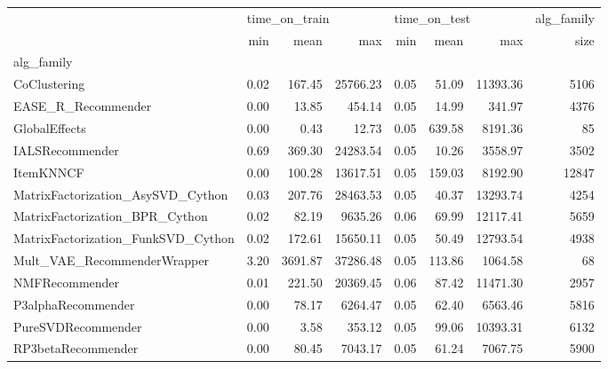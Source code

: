 \begin{tabular}{lrrrrrrr}
\toprule
{} & \multicolumn{3}{l}{time_on_train} & \multicolumn{3}{l}{time_on_test} & alg_family \\
{} &           min &    mean &      max &          min &   mean &      max &       size \\
alg_family                         &               &         &          &              &        &          &            \\
\midrule
CoClustering                       &          0.02 &  167.45 & 25766.23 &         0.05 &  51.09 & 11393.36 &       5106 \\
EASE_R_Recommender                 &          0.00 &   13.85 &   454.14 &         0.05 &  14.99 &   341.97 &       4376 \\
GlobalEffects                      &          0.00 &    0.43 &    12.73 &         0.05 & 639.58 &  8191.36 &         85 \\
IALSRecommender                    &          0.69 &  369.30 & 24283.54 &         0.05 &  10.26 &  3558.97 &       3502 \\
ItemKNNCF                          &          0.00 &  100.28 & 13617.51 &         0.05 & 159.03 &  8192.90 &      12847 \\
MatrixFactorization_AsySVD_Cython  &          0.03 &  207.76 & 28463.53 &         0.05 &  40.37 & 13293.74 &       4254 \\
MatrixFactorization_BPR_Cython     &          0.02 &   82.19 &  9635.26 &         0.06 &  69.99 & 12117.41 &       5659 \\
MatrixFactorization_FunkSVD_Cython &          0.02 &  172.61 & 15650.11 &         0.05 &  50.49 & 12793.54 &       4938 \\
Mult_VAE_RecommenderWrapper        &          3.20 & 3691.87 & 37286.48 &         0.05 & 113.86 &  1064.58 &         68 \\
NMFRecommender                     &          0.01 &  221.50 & 20369.45 &         0.06 &  87.42 & 11471.30 &       2957 \\
P3alphaRecommender                 &          0.00 &   78.17 &  6264.47 &         0.05 &  62.40 &  6563.46 &       5816 \\
PureSVDRecommender                 &          0.00 &    3.58 &   353.12 &         0.05 &  99.06 & 10393.31 &       6132 \\
RP3betaRecommender                 &          0.00 &   80.45 &  7043.17 &         0.05 &  61.24 &  7067.75 &       5900 \\

\end{tabular}
